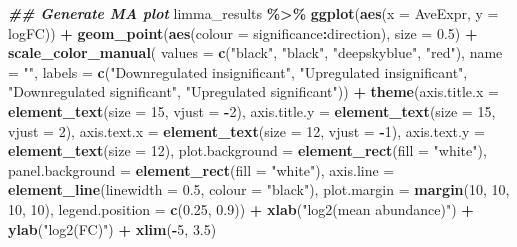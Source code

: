 \documentclass[9pt,a4paper,]{extarticle}
\newenvironment{Shaded}{\begin{snugshade}}{\end{snugshade}}
\newcommand{\AttributeTok}[1]{\textcolor[rgb]{0.13,0.29,0.53}{#1}}
\newcommand{\DecValTok}[1]{\textcolor[rgb]{0.00,0.00,0.81}{#1}}
\newcommand{\DocumentationTok}[1]{\textcolor[rgb]{0.56,0.35,0.01}{\textbf{\textit{#1}}}}
\newcommand{\FloatTok}[1]{\textcolor[rgb]{0.00,0.00,0.81}{#1}}
\newcommand{\FunctionTok}[1]{\textcolor[rgb]{0.13,0.29,0.53}{\textbf{#1}}}
\newcommand{\NormalTok}[1]{#1}
\newcommand{\SpecialCharTok}[1]{\textcolor[rgb]{0.81,0.36,0.00}{\textbf{#1}}}
\newcommand{\StringTok}[1]{\textcolor[rgb]{0.31,0.60,0.02}{#1}}
\begin{document}
\begin{Shaded}
\begin{Highlighting}[]
\DocumentationTok{\#\# Generate MA plot}
\NormalTok{limma\_results }\SpecialCharTok{\%\textgreater{}\%}
  \FunctionTok{ggplot}\NormalTok{(}\FunctionTok{aes}\NormalTok{(}\AttributeTok{x =}\NormalTok{ AveExpr, }\AttributeTok{y =}\NormalTok{ logFC)) }\SpecialCharTok{+}
  \FunctionTok{geom\_point}\NormalTok{(}\FunctionTok{aes}\NormalTok{(}\AttributeTok{colour =}\NormalTok{ significance}\SpecialCharTok{:}\NormalTok{direction), }\AttributeTok{size =} \FloatTok{0.5}\NormalTok{) }\SpecialCharTok{+}
  \FunctionTok{scale\_color\_manual}\NormalTok{(}
    \AttributeTok{values =} \FunctionTok{c}\NormalTok{(}\StringTok{"black"}\NormalTok{, }\StringTok{"black"}\NormalTok{, }\StringTok{"deepskyblue"}\NormalTok{, }\StringTok{"red"}\NormalTok{), }\AttributeTok{name =} \StringTok{""}\NormalTok{,}
    \AttributeTok{labels =} \FunctionTok{c}\NormalTok{(}\StringTok{"Downregulated insignificant"}\NormalTok{,}
               \StringTok{"Upregulated insignificant"}\NormalTok{,}
               \StringTok{"Downregulated significant"}\NormalTok{,}
               \StringTok{"Upregulated significant"}\NormalTok{)) }\SpecialCharTok{+}
  \FunctionTok{theme}\NormalTok{(}\AttributeTok{axis.title.x =} \FunctionTok{element\_text}\NormalTok{(}\AttributeTok{size =} \DecValTok{15}\NormalTok{, }\AttributeTok{vjust =} \SpecialCharTok{{-}}\DecValTok{2}\NormalTok{),}
        \AttributeTok{axis.title.y =} \FunctionTok{element\_text}\NormalTok{(}\AttributeTok{size =} \DecValTok{15}\NormalTok{, }\AttributeTok{vjust =} \DecValTok{2}\NormalTok{),}
        \AttributeTok{axis.text.x =} \FunctionTok{element\_text}\NormalTok{(}\AttributeTok{size =} \DecValTok{12}\NormalTok{, }\AttributeTok{vjust =} \SpecialCharTok{{-}}\DecValTok{1}\NormalTok{),}
        \AttributeTok{axis.text.y =} \FunctionTok{element\_text}\NormalTok{(}\AttributeTok{size =} \DecValTok{12}\NormalTok{),}
        \AttributeTok{plot.background =} \FunctionTok{element\_rect}\NormalTok{(}\AttributeTok{fill =} \StringTok{"white"}\NormalTok{),}
        \AttributeTok{panel.background =} \FunctionTok{element\_rect}\NormalTok{(}\AttributeTok{fill =} \StringTok{"white"}\NormalTok{),}
        \AttributeTok{axis.line =} \FunctionTok{element\_line}\NormalTok{(}\AttributeTok{linewidth =} \FloatTok{0.5}\NormalTok{, }\AttributeTok{colour =} \StringTok{"black"}\NormalTok{),}
        \AttributeTok{plot.margin =} \FunctionTok{margin}\NormalTok{(}\DecValTok{10}\NormalTok{, }\DecValTok{10}\NormalTok{, }\DecValTok{10}\NormalTok{, }\DecValTok{10}\NormalTok{),}
        \AttributeTok{legend.position =} \FunctionTok{c}\NormalTok{(}\FloatTok{0.25}\NormalTok{, }\FloatTok{0.9}\NormalTok{)) }\SpecialCharTok{+}
  \FunctionTok{xlab}\NormalTok{(}\StringTok{"log2(mean abundance)"}\NormalTok{) }\SpecialCharTok{+}
  \FunctionTok{ylab}\NormalTok{(}\StringTok{"log2(FC)"}\NormalTok{) }\SpecialCharTok{+}
  \FunctionTok{xlim}\NormalTok{(}\SpecialCharTok{{-}}\DecValTok{5}\NormalTok{, }\FloatTok{3.5}\NormalTok{)}
\end{Highlighting}
\end{Shaded}
\end{document}
